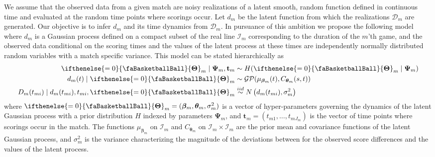 \documentclass[
  11pt,
]{svjour3}
\theoremstyle{nonumberplain}
\begin{document}
We assume that the observed data from a given match are noisy
realizations of a latent smooth, random function defined in continuous
time and evaluated at the random time points where scorings occur. Let
\(d_m\) be the latent function from which the realizations
\(\mathcal{D}_m\) are generated. Our objective is to infer \(d_m\) and
its time dynamics from \(\mathcal{D}_m\). In pursuance of this ambition
we propose the following model where \(d_m\) is a Gaussian process
defined on a compact subset of the real line \(\mathcal{I}_m\)
corresponding to the duration of the \(m\)'th game, and the observed
data conditional on the scoring times and the values of the latent
process at these times are independently normally distributed random
variables with a match specific variance. This model can be stated
hierarchically as \begin{align}
\begin{split}
  \ifthenelse{\value{bbsym4theta}=0}{\text{\faBasketballBall}}{\mathbf{\Theta}}_m \mid \bm{\Psi}_m, \mathbf{t}_m &\sim H(\ifthenelse{\value{bbsym4theta}=0}{\text{\faBasketballBall}}{\mathbf{\Theta}}_m \mid \bm{\Psi}_m)\\
  d_m(t) \mid \ifthenelse{\value{bbsym4theta}=0}{\text{\faBasketballBall}}{\mathbf{\Theta}}_m &\sim \mathcal{GP}(\mu_{\bm{\beta}_m}(t), C_{\bm{\theta}_m}(s, t))\\
  D_m(t_{mi}) \mid d_m(t_{mi}), t_{mi}, \ifthenelse{\value{bbsym4theta}=0}{\text{\faBasketballBall}}{\mathbf{\Theta}}_m &\overset{iid}{\sim} N\left(d_m(t_{mi}), \sigma_{m}^2\right)
\end{split}
\label{eq:hierarchicalmodel}
\end{align} where
\(\ifthenelse{\value{bbsym4theta}=0}{\text{\faBasketballBall}}{\mathbf{\Theta}}_m = (\bm{\beta}_m, \bm{\theta}_m, \sigma_{m}^2)\)
is a vector of hyper-parameters governing the dynamics of the latent
Gaussian process with a prior distribution \(H\) indexed by parameters
\(\bm{\Psi}_m\), and \(\mathbf{t}_m = (t_{m1}, \ldots, t_{m J_m})\) is
the vector of time points where scorings occur in the match. The
functions \(\mu_{\bm{\beta}_m}\) on \(\mathcal{I}_m\) and
\(C_{\bm{\theta}_m}\) on \(\mathcal{I}_m \times \mathcal{I}_m\) are the
prior mean and covariance functions of the latent Gaussian process, and
\(\sigma_m^2\) is the variance characterizing the magnitude of the
deviations between for the observed score differences and the values of
the latent process.
\end{document}
